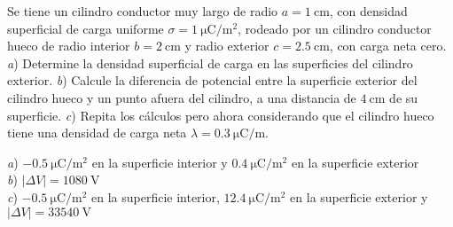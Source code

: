 %
\begin{center}
\end{center}
%
\begin{Exercise}
  Se tiene un cilindro conductor muy largo de radio $a = \SI{1}{\centi\metre}$, con densidad superficial de carga uniforme $\sigma = \SI{1}{\micro\coulomb/\metre\squared}$, rodeado por un cilindro conductor hueco de radio interior $b = \SI{2}{\centi\metre}$ y radio exterior $c = \SI{2.5}{\centi\metre}$, con carga neta cero. \textit{a}) Determine la densidad superficial de carga en las superficies del cilindro exterior. \textit{b}) Calcule la diferencia de potencial entre la superficie exterior del cilindro hueco y un punto afuera del cilindro, a una distancia de $\SI{4}{\centi\metre}$ de su superficie. \textit{c}) Repita los cálculos pero ahora considerando que el cilindro hueco tiene una densidad de carga neta $\lambda = \SI{0.3}{\micro\coulomb/\metre}$.
\end{Exercise}
\begin{Answer}
  \begin{minipage}[t]{.4\textwidth}
    \textit{a}) $\SI{-0.5}{\micro\coulomb/\metre\squared}$ en la superficie interior y $\SI{0.4}{\micro\coulomb/\metre\squared}$ en la superficie exterior\\ \textit{b}) $|\Delta V| = \SI{1080}{\volt}$\\ \textit{c}) $\SI{-0.5}{\micro\coulomb/\metre\squared}$ en la superficie interior, $\SI{12.4}{\micro\coulomb/\metre\squared}$ en la superficie exterior y $|\Delta V| = \SI{33540}{\volt}$
  \end{minipage}
\end{Answer}
